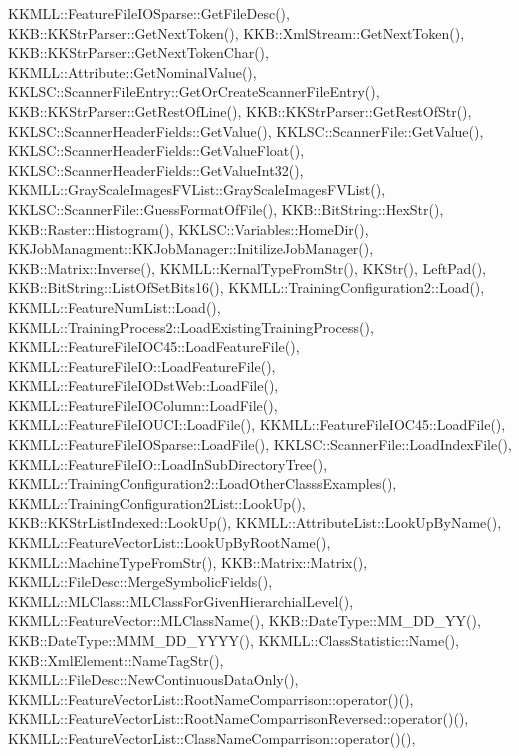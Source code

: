 K\+K\+M\+L\+L\+::\+Feature\+File\+I\+O\+Sparse\+::\+Get\+File\+Desc(), K\+K\+B\+::\+K\+K\+Str\+Parser\+::\+Get\+Next\+Token(), K\+K\+B\+::\+Xml\+Stream\+::\+Get\+Next\+Token(), K\+K\+B\+::\+K\+K\+Str\+Parser\+::\+Get\+Next\+Token\+Char(), K\+K\+M\+L\+L\+::\+Attribute\+::\+Get\+Nominal\+Value(), K\+K\+L\+S\+C\+::\+Scanner\+File\+Entry\+::\+Get\+Or\+Create\+Scanner\+File\+Entry(), K\+K\+B\+::\+K\+K\+Str\+Parser\+::\+Get\+Rest\+Of\+Line(), K\+K\+B\+::\+K\+K\+Str\+Parser\+::\+Get\+Rest\+Of\+Str(), K\+K\+L\+S\+C\+::\+Scanner\+Header\+Fields\+::\+Get\+Value(), K\+K\+L\+S\+C\+::\+Scanner\+File\+::\+Get\+Value(), K\+K\+L\+S\+C\+::\+Scanner\+Header\+Fields\+::\+Get\+Value\+Float(), K\+K\+L\+S\+C\+::\+Scanner\+Header\+Fields\+::\+Get\+Value\+Int32(), K\+K\+M\+L\+L\+::\+Gray\+Scale\+Images\+F\+V\+List\+::\+Gray\+Scale\+Images\+F\+V\+List(), K\+K\+L\+S\+C\+::\+Scanner\+File\+::\+Guess\+Format\+Of\+File(), K\+K\+B\+::\+Bit\+String\+::\+Hex\+Str(), K\+K\+B\+::\+Raster\+::\+Histogram(), K\+K\+L\+S\+C\+::\+Variables\+::\+Home\+Dir(), K\+K\+Job\+Managment\+::\+K\+K\+Job\+Manager\+::\+Initilize\+Job\+Manager(), K\+K\+B\+::\+Matrix\+::\+Inverse(), K\+K\+M\+L\+L\+::\+Kernal\+Type\+From\+Str(), K\+K\+Str(), Left\+Pad(), K\+K\+B\+::\+Bit\+String\+::\+List\+Of\+Set\+Bits16(), K\+K\+M\+L\+L\+::\+Training\+Configuration2\+::\+Load(), K\+K\+M\+L\+L\+::\+Feature\+Num\+List\+::\+Load(), K\+K\+M\+L\+L\+::\+Training\+Process2\+::\+Load\+Existing\+Training\+Process(), K\+K\+M\+L\+L\+::\+Feature\+File\+I\+O\+C45\+::\+Load\+Feature\+File(), K\+K\+M\+L\+L\+::\+Feature\+File\+I\+O\+::\+Load\+Feature\+File(), K\+K\+M\+L\+L\+::\+Feature\+File\+I\+O\+Dst\+Web\+::\+Load\+File(), K\+K\+M\+L\+L\+::\+Feature\+File\+I\+O\+Column\+::\+Load\+File(), K\+K\+M\+L\+L\+::\+Feature\+File\+I\+O\+U\+C\+I\+::\+Load\+File(), K\+K\+M\+L\+L\+::\+Feature\+File\+I\+O\+C45\+::\+Load\+File(), K\+K\+M\+L\+L\+::\+Feature\+File\+I\+O\+Sparse\+::\+Load\+File(), K\+K\+L\+S\+C\+::\+Scanner\+File\+::\+Load\+Index\+File(), K\+K\+M\+L\+L\+::\+Feature\+File\+I\+O\+::\+Load\+In\+Sub\+Directory\+Tree(), K\+K\+M\+L\+L\+::\+Training\+Configuration2\+::\+Load\+Other\+Classs\+Examples(), K\+K\+M\+L\+L\+::\+Training\+Configuration2\+List\+::\+Look\+Up(), K\+K\+B\+::\+K\+K\+Str\+List\+Indexed\+::\+Look\+Up(), K\+K\+M\+L\+L\+::\+Attribute\+List\+::\+Look\+Up\+By\+Name(), K\+K\+M\+L\+L\+::\+Feature\+Vector\+List\+::\+Look\+Up\+By\+Root\+Name(), K\+K\+M\+L\+L\+::\+Machine\+Type\+From\+Str(), K\+K\+B\+::\+Matrix\+::\+Matrix(), K\+K\+M\+L\+L\+::\+File\+Desc\+::\+Merge\+Symbolic\+Fields(), K\+K\+M\+L\+L\+::\+M\+L\+Class\+::\+M\+L\+Class\+For\+Given\+Hierarchial\+Level(), K\+K\+M\+L\+L\+::\+Feature\+Vector\+::\+M\+L\+Class\+Name(), K\+K\+B\+::\+Date\+Type\+::\+M\+M\+\_\+\+D\+D\+\_\+\+Y\+Y(), K\+K\+B\+::\+Date\+Type\+::\+M\+M\+M\+\_\+\+D\+D\+\_\+\+Y\+Y\+Y\+Y(), K\+K\+M\+L\+L\+::\+Class\+Statistic\+::\+Name(), K\+K\+B\+::\+Xml\+Element\+::\+Name\+Tag\+Str(), K\+K\+M\+L\+L\+::\+File\+Desc\+::\+New\+Continuous\+Data\+Only(), K\+K\+M\+L\+L\+::\+Feature\+Vector\+List\+::\+Root\+Name\+Comparrison\+::operator()(), K\+K\+M\+L\+L\+::\+Feature\+Vector\+List\+::\+Root\+Name\+Comparrison\+Reversed\+::operator()(), K\+K\+M\+L\+L\+::\+Feature\+Vector\+List\+::\+Class\+Name\+Comparrison\+::operator()(), 